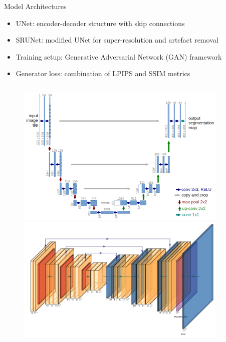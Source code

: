 \documentclass{beamer}
\begin{document}
\begin{frame}{Model Architectures}
\begin{itemize}
  \item UNet: encoder-decoder structure with skip connections
  \item SRUNet: modified UNet for super-resolution and artefact removal
  \item Training setup: Generative Adversarial Network (GAN) framework
  \item Generator loss: combination of LPIPS and SSIM metrics
\end{itemize}
\begin{figure}
\begin{columns}
\includegraphics[width=0.9\textwidth]{../thesis/static/unet_architecture.png}
\includegraphics[width=0.9\textwidth]{../thesis/static/srunet_architecture.png}
\end{columns}
\end{figure}
\end{frame}
\end{document}
